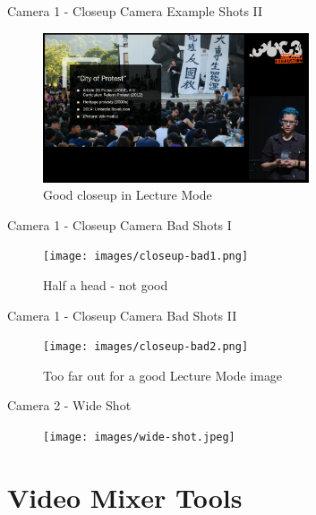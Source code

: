 \documentclass[aspectratio=169]{beamer}
\begin{document}
\begin{frame}{Camera 1 - Closeup Camera}
	Example Shots II
	\begin{figure} 
		\centering
		\includegraphics[width=0.7\textwidth]{images/closeup2.jpg}
		\caption{Good closeup in Lecture Mode}
	\end{figure}
\end{frame}

\begin{frame}{Camera 1 - Closeup Camera}
	Bad Shots I
	\begin{figure} 
		\centering
		\texttt{[image: images/closeup-bad1.png]}
		\caption{Half a head - not good}
	\end{figure}
\end{frame}

\begin{frame}{Camera 1 - Closeup Camera}
	Bad Shots II
	\begin{figure} 
		\centering
		\texttt{[image: images/closeup-bad2.png]}
		\caption{Too far out for a good Lecture Mode image}
	\end{figure}
\end{frame}

\begin{frame}{Camera 2 - Wide Shot}
	\begin{figure} 
		\centering
		\texttt{[image: images/wide-shot.jpeg]}
	\end{figure}
\end{frame}


\section{Video Mixer Tools}
\end{document}
